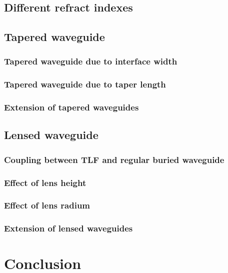 \section{Different refract indexes}
%

\section{Tapered waveguide}
%

\subsection{Tapered waveguide due to interface width} 
%

\subsection{Tapered waveguide due to taper length}
%

\subsection{Extension of tapered waveguides}
\label{sect:optim_tapered_ext}
%

\section{Lensed waveguide}
%

\subsection{Coupling between TLF and regular buried waveguide}
\label{sect:optim_lensed_regular}
%

\subsection{Effect of lens height}
%
%
\subsection{Effect of lens radium}
%

\subsection{Extension of lensed waveguides}
\label{sect:optim_lensed_ext}
%
%
\chapter{Conclusion}
%
%



